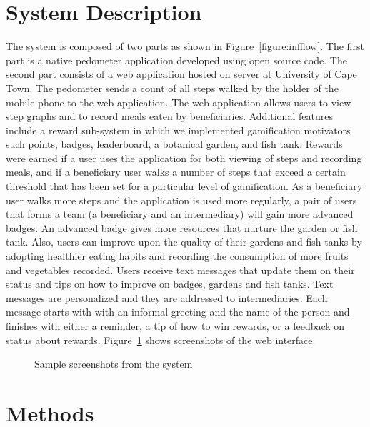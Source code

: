 \documentclass{sig-alternate}
\begin{document}
\section{System Description}

The system is composed of two parts as shown in Figure~\ref{figure:infflow}. The
first part is a  native pedometer application developed using open source
code. The second part consists of a web application hosted on server at
University of Cape Town. The pedometer sends a count of all steps walked by
the holder of the mobile phone to the web
application. The web application allows users to view step graphs and 
to record meals eaten by beneficiaries. Additional features include a reward
sub-system in which we implemented gamification motivators such points, badges,
leaderboard, a botanical garden, and fish tank. Rewards were earned if a user
uses the application for both viewing of steps and  recording meals, and if a
beneficiary user walks a number of steps that exceed a certain threshold that
has been set for a particular level of gamification. As a beneficiary user
walks more steps and the application is used more regularly, a pair of users
that forms a team (a beneficiary and an intermediary) will gain
more advanced badges. An advanced badge gives more resources that nurture the
garden or fish tank. Also, users can improve upon the quality of their gardens
and fish tanks by adopting healthier eating habits and recording the 
consumption of
 more fruits and vegetables recorded.
Users receive text messages that
update them on their status and tips on how to improve on badges, gardens and
fish tanks. Text messages are personalized and they are addressed to
intermediaries. Each message starts with with an informal greeting and the
name of the person and finishes with either a reminder, a tip of how to win
rewards, or a feedback on status about rewards. Figure~\ref{figure:screens}
shows screenshots of the web interface.

 \begin{figure*}
\centering
{}
\caption{Information flow inside the system}
\label{figure:infflow}
\end{figure*}
\begin{figure}
\centering
{}
\caption{Sample screenshots from the system}
\label{figure:screens}
\end{figure}

\section{Methods}
\end{document}
